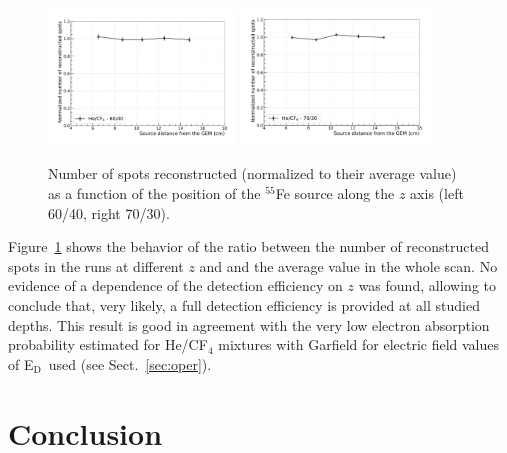 \documentclass[a4paper,11pt]{article}
\newcommand{\Ed}  {E$_{\mathrm{D}}$}
\begin{document}
\begin{figure}[ht]
\centering
\includegraphics[width=0.445\textwidth]{Figures/feZscan6040_wo_4.pdf}
\includegraphics[width=0.45\textwidth]{Figures/feZscan7030_wo_4.pdf}
\caption{Number of spots reconstructed (normalized to their average value) as a function of the position of the $^{55}$Fe source along the $z$ axis (left 60/40, right 70/30).} 
\label{fig:effZ}
\end{figure}

Figure~\ref{fig:effZ} shows the behavior of the ratio between the number of reconstructed spots in the runs at different $z$ and and the average value in the whole scan.  
No evidence of a dependence of the detection efficiency on $z$ was found, allowing to conclude that, very likely, a full detection efficiency is provided at all studied depths. This result is good in agreement with the very low electron absorption probability estimated for He/CF$_4$  mixtures with Garfield for electric field values of \Ed\ used (see Sect.~\ref{sec:oper}). 


\section{Conclusion}
\end{document}
